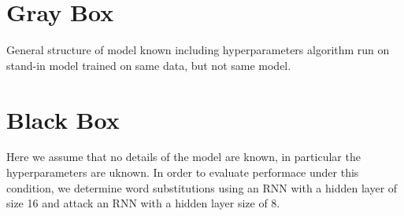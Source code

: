 \section{Gray Box}
General structure of model known including hyperparameters
 algorithm run on stand-in model trained on same data, but not same model.
\section{Black Box}
Here we assume that no details of the model are known, in particular the hyperparameters are uknown.  In order to evaluate performace under this condition, we determine word substitutions using an RNN with a hidden layer of size 16 and attack an RNN with a hidden layer size of 8.  
